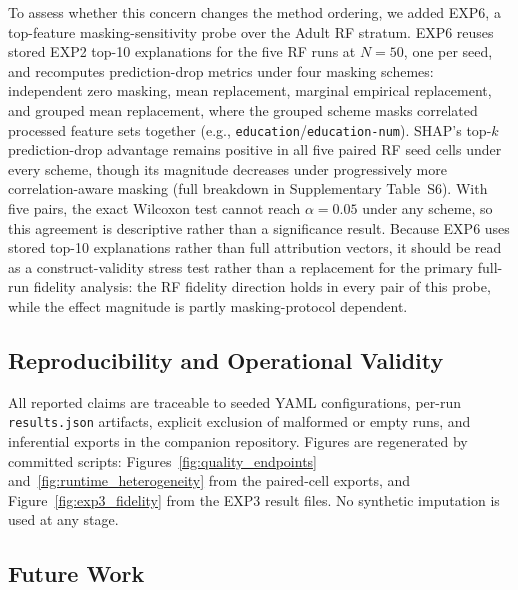 \documentclass[10pt]{article}
\begin{document}
To assess whether this concern changes the method ordering, we added EXP6,
a top-feature masking-sensitivity probe over the Adult RF stratum. EXP6
reuses stored EXP2 top-10 explanations for the five RF runs at $N=50$,
one per seed, and recomputes prediction-drop metrics under four masking schemes:
independent zero masking, mean replacement, marginal empirical replacement,
and grouped mean replacement, where the grouped scheme masks correlated
processed feature sets together (e.g.,
\texttt{education}/\texttt{education-num}). SHAP's top-$k$ prediction-drop
advantage remains positive in all five paired RF seed cells under every
scheme, though its magnitude decreases under progressively more
correlation-aware masking (full breakdown in Supplementary
Table~S6). With five pairs, the exact Wilcoxon test cannot reach
$\alpha = 0.05$ under any scheme, so this agreement is descriptive rather
than a significance result. Because EXP6 uses stored top-10 explanations rather than full
attribution vectors, it should be read as a construct-validity stress test
rather than a replacement for the primary full-run fidelity analysis: the
RF fidelity direction holds in every pair of this probe, while the effect magnitude
is partly masking-protocol dependent.

\subsection{Reproducibility and Operational Validity}

All reported claims are traceable to seeded YAML configurations, per-run
\texttt{results.json} artifacts, explicit exclusion of malformed or empty
runs, and inferential exports in the companion repository. Figures are
regenerated by committed scripts: Figures~\ref{fig:quality_endpoints}
and~\ref{fig:runtime_heterogeneity} from the paired-cell exports, and
Figure~\ref{fig:exp3_fidelity} from the EXP3 result files. No synthetic
imputation is used at any stage.

\subsection{Future Work}
\end{document}

